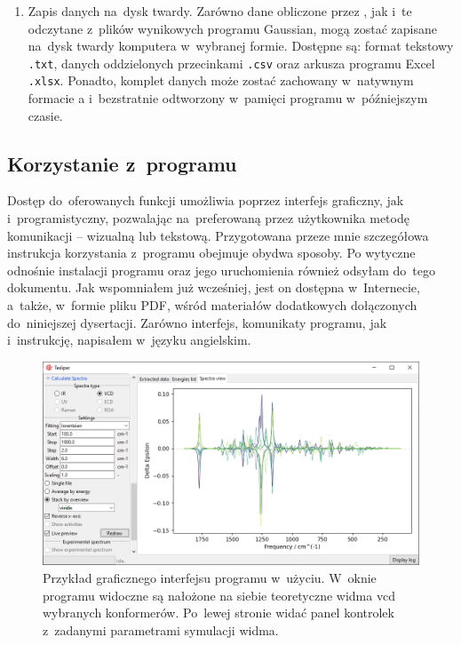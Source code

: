 \begin{enumerate}
  \item Zapis danych na~dysk twardy.
    Zarówno dane obliczone przez \tesliper{}, jak i~te odczytane z~plików wynikowych programu
      Gaussian, mogą zostać zapisane na~dysk twardy komputera w~wybranej formie.
    Dostępne są: format tekstowy \texttt{.txt}, danych oddzielonych przecinkami \texttt{.csv}
      oraz arkusza programu Excel \texttt{.xlsx}.
    Ponadto, komplet danych może zostać zachowany w~natywnym formacie \tesliper{}a
      i~bezstratnie odtworzony w~pamięci programu w~późniejszym czasie.
  
\end{enumerate}

\subsection{Korzystanie z~programu}\label{essence:use}
Dostęp do~oferowanych funkcji \tesliper{} umożliwia poprzez interfejs graficzny, jak
  i~programistyczny, pozwalając na~preferowaną przez użytkownika metodę komunikacji \---
  wizualną lub tekstową.
Przygotowana przeze mnie szczegółowa instrukcja korzystania z~programu obejmuje obydwa sposoby.
Po wytyczne odnośnie instalacji programu oraz jego uruchomienia również odsyłam do~tego
  dokumentu.
Jak wspomniałem już wcześniej, jest on dostępna w~Internecie,
  a~także, w~formie pliku PDF, wśród materiałów dodatkowych dołączonych do~niniejszej dysertacji.
Zarówno interfejs, komunikaty programu, jak i~instrukcję, napisałem w~języku angielskim.

\begin{figure}
  \includegraphics[width=\textwidth]{./chapter-4/essence/gui-demo}
  \caption{
    Przykład graficznego interfejsu programu \tesliper{} w~użyciu.
    W~oknie programu widoczne są nałożone na siebie teoretyczne widma \gls{vcd}
      wybranych konformerów.
    Po~lewej stronie widać panel kontrolek z~zadanymi parametrami symulacji widma.
  }
  \label{fig:gui-demo}
\end{figure}

